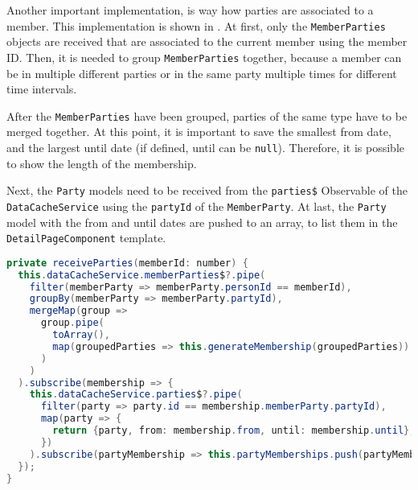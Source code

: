 Another important implementation, is way how parties are associated to a member. This implementation is shown in .
At first, only the \texttt{MemberParties} objects are received that are associated to the current member using the member ID.
Then, it is needed to group \texttt{MemberParties} together, because a member can be in multiple different parties or in the same party multiple times for different time intervals.

After the \texttt{MemberParties} have been grouped, parties of the same type have to be merged together. At this point, it is important to save the smallest from date, and the largest until date (if defined, until can be \texttt{null}). Therefore, it is possible to show the length of the membership.

Next, the \texttt{Party} models need to be received from the \texttt{parties\$} Observable of the \texttt{DataCacheService} using the \texttt{partyId} of the \texttt{MemberParty}.
At last, the \texttt{Party} model with the from and until dates are pushed to an array, to list them in the \texttt{DetailPageComponent} template.
\begin{lstlisting}[label=lst:02_impl_detail_receiveParties, caption=\texttt{MemberService} implementation, language=java]
private receiveParties(memberId: number) {
  this.dataCacheService.memberParties$?.pipe(
    filter(memberParty => memberParty.personId == memberId),
    groupBy(memberParty => memberParty.partyId),
    mergeMap(group =>
      group.pipe(
        toArray(),
        map(groupedParties => this.generateMembership(groupedParties))
      )
    )
  ).subscribe(membership => {
    this.dataCacheService.parties$?.pipe(
      filter(party => party.id == membership.memberParty.partyId),
      map(party => {
        return {party, from: membership.from, until: membership.until};
      })
    ).subscribe(partyMembership => this.partyMemberships.push(partyMembership));
  });
}
\end{lstlisting}
